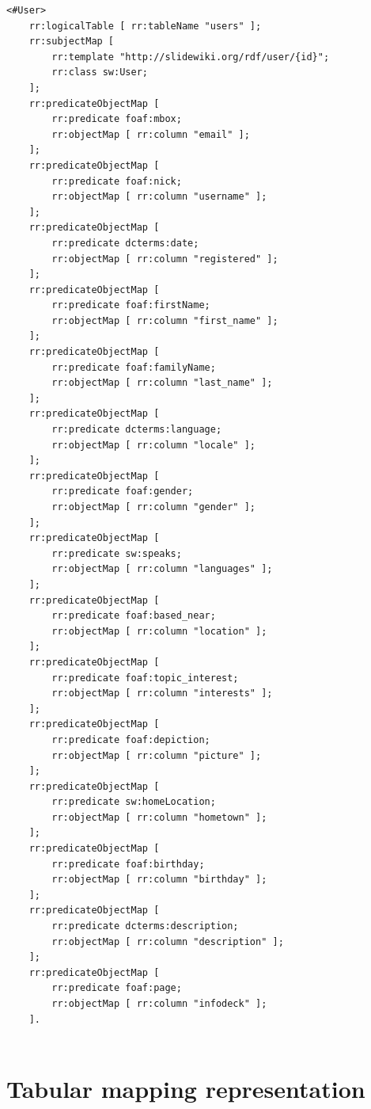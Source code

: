 \begin{lstlisting}
<#User>
    rr:logicalTable [ rr:tableName "users" ];
    rr:subjectMap [
        rr:template "http://slidewiki.org/rdf/user/{id}";
        rr:class sw:User;
    ];
    rr:predicateObjectMap [
        rr:predicate foaf:mbox;
        rr:objectMap [ rr:column "email" ];
    ];
    rr:predicateObjectMap [
        rr:predicate foaf:nick;
        rr:objectMap [ rr:column "username" ];
    ];
    rr:predicateObjectMap [
        rr:predicate dcterms:date;
        rr:objectMap [ rr:column "registered" ];
    ];
    rr:predicateObjectMap [
        rr:predicate foaf:firstName;
        rr:objectMap [ rr:column "first_name" ];
    ];
    rr:predicateObjectMap [
        rr:predicate foaf:familyName;
        rr:objectMap [ rr:column "last_name" ];
    ];
	rr:predicateObjectMap [
        rr:predicate dcterms:language;
        rr:objectMap [ rr:column "locale" ];
    ];
	rr:predicateObjectMap [
        rr:predicate foaf:gender;
        rr:objectMap [ rr:column "gender" ];
    ];
	rr:predicateObjectMap [
        rr:predicate sw:speaks;
        rr:objectMap [ rr:column "languages" ];
    ];
	rr:predicateObjectMap [
        rr:predicate foaf:based_near;
        rr:objectMap [ rr:column "location" ];
    ];
	rr:predicateObjectMap [
        rr:predicate foaf:topic_interest;
        rr:objectMap [ rr:column "interests" ];
    ];
	rr:predicateObjectMap [
        rr:predicate foaf:depiction;
        rr:objectMap [ rr:column "picture" ];
    ];
	rr:predicateObjectMap [
        rr:predicate sw:homeLocation;
        rr:objectMap [ rr:column "hometown" ];
    ];
	rr:predicateObjectMap [
        rr:predicate foaf:birthday;
        rr:objectMap [ rr:column "birthday" ];
    ];
	rr:predicateObjectMap [
        rr:predicate dcterms:description;
        rr:objectMap [ rr:column "description" ];
    ];
	rr:predicateObjectMap [
        rr:predicate foaf:page;
        rr:objectMap [ rr:column "infodeck" ];
    ].
    
\end{lstlisting}

\section{Tabular mapping representation}

